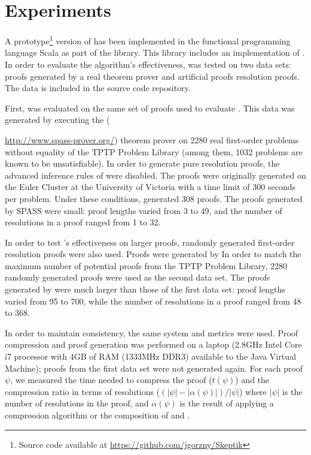 \section{Experiments} \label{sec:exp}

A prototype\footnote{Source code available at \url{https://github.com/jgorzny/Skeptik}} version of {\FORPI} has been implemented in the functional programming language Scala as part of the \skeptik
library. This library includes an implementation of {\GFOLU} \cite{GFOLU}. In order to evaluate the algorithm's effectiveness, {\FORPI} was tested on two data sets: proofs generated by a real theorem prover and artificial proofs resolution proofs. The data is included in the source code repository.

First, {\FORPI} was evaluated on the same set of proofs used to evaluate {\GFOLU}. This data was generated by executing the {\SPASS} ({\url{http://www.spass-prover.org/}) theorem prover on 2280 real first-order problems without equality of the TPTP Problem Library (among them, 1032 problems are known to be unsatisfiable). In order to generate pure resolution proofs, the advanced inference rules of {\SPASS} were disabled. The proofs were originally generated on the Euler Cluster at the University of Victoria with a time limit of 300 seconds per problem. Under these conditions, {\SPASS} generated 308 proofs. The proofs generated by SPASS were small: proof lengths varied from 3 to 49, and the number of resolutions in a proof ranged from 1 to 32.

In order to test {\FORPI}'s effectiveness on larger proofs, randomly generated first-order resolution proofs were also used.
Proofs were generated by 
In order to match the maximum number of potential proofs from the TPTP Problem Library, 2280 randomly generated proofs were used as the second data set. The proofs generated by were much larger than those of the first data set: proof lengths varied from 95 to 700, while the number of resolutions in a proof ranged from 48 to 368.

In order to maintain consistency, the same system and metrics were used. Proof compression and proof generation was performed on a laptop (2.8GHz Intel Core i7 processor with 4GB of RAM (1333MHz DDR3) available to the Java Virtual Machine); proofs from the first data set were not generated again. For each proof $\psi$, we measured the time needed to compress the proof ($t(\psi)$) and the compression ratio in terms of resolutions ($(|\psi|-|\alpha(\psi)|)/|\psi|$) where $|\psi|$ is the number of resolutions in the proof, and $\alpha(\psi)$ is the result of applying a compression algorithm or the composition of {\FORPI} and {\GFOLU}.

}
